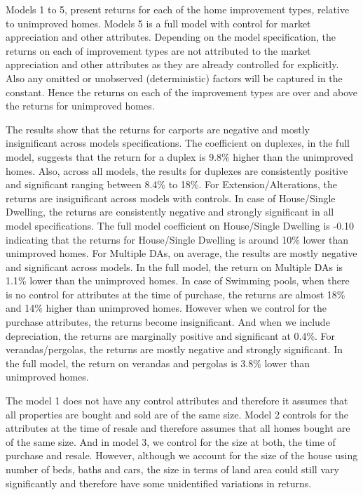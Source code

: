 \documentclass[AEJ,reqno, draftmode]{AEA} %
\begin{document}
Models 1 to 5, present returns for each of the home improvement types, relative to unimproved homes. Models 5 is a full model with control for market appreciation and other attributes. Depending on the model specification, the returns on each of improvement types are not attributed to the market appreciation and other attributes as they are already controlled for explicitly. Also any omitted or unobserved (deterministic) factors will be captured in the constant. Hence the returns on each of the improvement types are over and above the returns for unimproved homes. 


\restoregeometry

The results show that the returns for carports are negative and mostly insignificant across models specifications. The coefficient on duplexes, in the full model, suggests that the return for a duplex is 9.8\% higher than the unimproved homes. Also, across all models, the results for duplexes are consistently positive and significant ranging between 8.4\% to 18\%. For Extension/Alterations, the returns are insignificant across models with controls. In case of House/Single Dwelling, the returns are consistently negative and strongly significant in all model specifications. The full model coefficient on House/Single Dwelling is -0.10 indicating that the returns for House/Single Dwelling is around 10\% lower than unimproved homes. For Multiple DAs, on average, the results are mostly negative and significant across models. In the full model, the return on Multiple DAs is 1.1\% lower than the unimproved homes. In case of Swimming pools, when there is no control for attributes at the time of purchase, the returns are almost 18\% and 14\% higher than unimproved homes. However when we control for the purchase attributes, the returns become insignificant. And when we include depreciation, the returns are marginally positive and significant at 0.4\%. For verandas/pergolas, the returns are mostly negative and strongly significant. In the full model, the return on verandas and pergolas is 3.8\% lower than unimproved homes.

The model 1 does not have any control attributes and therefore it assumes that all properties are bought and sold are of the same size. Model 2 controls for the attributes at the time of resale and therefore assumes that all homes bought are of the same size. And in model 3, we control for the size at both, the time of purchase and resale. However, although we account for the size of the house using number of beds, baths and cars, the size in terms of land area could still vary significantly and therefore have some unidentified variations in returns. 
\end{document}
